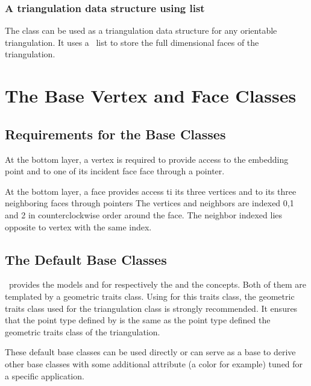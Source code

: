 \subsubsection{A triangulation data structure using list}
The class 
can be used as a triangulation data structure for any
orientable triangulation. It uses a \stl\ list to store the
full dimensional faces of the triangulation.



\section{The Base Vertex and Face Classes }
\label{I1_Sect_Base_classes}

\subsection{Requirements for the Base Classes}
At the bottom layer,  
a vertex is required to provide access to the embedding point
and to one of its incident face
face through a
 pointer.


At the bottom layer, a 
face provides access ti its three vertices and to its three
neighboring faces through  pointers
The vertices and neighbors are indexed 0,1 and 2 in counterclockwise
order around the face. The neighbor indexed 
 lies opposite to vertex with the same index.



\subsection{The Default Base Classes}
\cgal\ provides the models
 and
 for 
respectively 
the  and the 
 concepts.
Both of them are templated by a geometric traits class.
Using for this traits class, the geometric traits class used for the triangulation class
is strongly recommended. 
It ensures that the point type defined by 
is the same as the point type defined the  geometric traits class of
the triangulation.

These default base classes can be used directly or can serve as a base to derive
other base classes with some additional attribute (a color for example)
tuned for a specific application.


